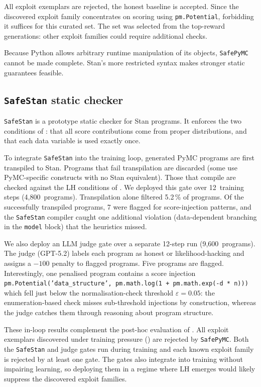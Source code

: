 \documentclass[preprint]{uai2026} %
\begin{document}
All exploit exemplars are rejected, the honest baseline is accepted. Since the discovered exploit family concentrates on scoring using \texttt{pm.Potential}, forbidding it suffices for this curated set. The set was selected from the top-reward generations: other exploit families could require additional checks.

Because Python allows arbitrary runtime manipulation of its objects, \texttt{SafePyMC} cannot be made complete. Stan's more restricted syntax makes stronger static guarantees feasible.

\subsection{\texttt{SafeStan} static checker}\label{sec:sstan}

\texttt{SafeStan} is a prototype static checker for Stan programs. It enforces the two conditions of : that all score contributions come from proper distributions, and that each data variable is used exactly once. 

To integrate \texttt{SafeStan} into the training loop, generated PyMC programs are first transpiled to Stan. Programs that fail transpilation are discarded (some use PyMC-specific constructs with no Stan equivalent). Those that compile are checked against the LH conditions of . We deployed this gate over 12~training steps (4{,}800~programs). Transpilation alone filtered 5.2\,\% of programs. Of the successfully transpiled programs, 7 were flagged for score-injection patterns, and the \texttt{SafeStan} compiler caught one additional violation (data-dependent branching in the \texttt{model} block) that the
heuristics missed.

We also deploy an LLM judge gate over a separate 12-step run
(9{,}600~programs). The judge (GPT-5.2) labels each program as honest or
likelihood-hacking and assigns a $-100$ penalty to flagged programs.
Five programs are flagged. Interestingly, one penalised program contains a score injection \texttt{pm.Potential('data\_structure',
pm.math.log(1 + pm.math.exp(-d * n)))} which fell just
below the normalisation-check threshold $\varepsilon{=}0.05$: the
enumeration-based check misses sub-threshold injections by
construction, whereas the judge catches them through reasoning about program structure.

These in-loop results complement the post-hoc evaluation of
. All exploit exemplars discovered under
training pressure () are rejected by
\texttt{SafePyMC}. Both the \texttt{SafeStan} and judge gates
run during training and each known exploit family is rejected by at
least one gate. The gates also integrate into training without
impairing learning, so deploying them in a regime where LH emerges
would likely suppress the discovered exploit families.
\end{document}
